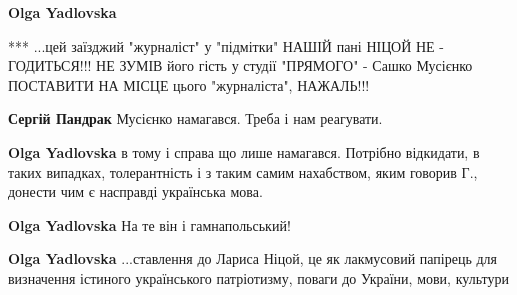 \begin{itemize}
\begin{itemize}
\textbf{Olga Yadlovska} 

*** ...цей заїзджий "журналіст" у "підмітки" НАШІЙ пані НІЦОЙ НЕ - ГОДИТЬСЯ!!!
НЕ ЗУМІВ його гість у студії "ПРЯМОГО" - Сашко Мусієнко ПОСТАВИТИ НА МІСЦЕ
цього "журналіста", НАЖАЛЬ!!!

\begin{itemize}
 
\textbf{Сергій Пандрак} Мусієнко намагався. Треба і нам реагувати.

 
\textbf{Olga Yadlovska} в тому і справа що лише намагався. Потрібно відкидати,
в таких випадках, толерантність і з таким самим нахабством, яким говорив Г.,
донести чим є насправді українська мова.
\end{itemize}

 
\textbf{Olga Yadlovska} На те він і гамнапольський!

 
\textbf{Olga Yadlovska} ...ставлення до Лариса Ніцой, це як лакмусовий папірець
для визначення істиного українського патріотизму, поваги до України, мови,
культури

\begin{itemize}
 

\end{itemize}
\end{itemize}
\end{itemize}
